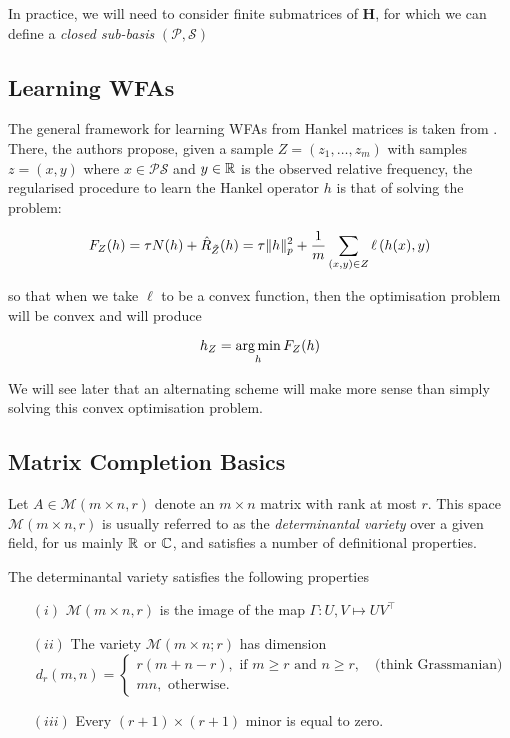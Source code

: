 \documentclass[12pt]{article}
\begin{document}
In practice, we will need to consider finite submatrices of $\mathbf{H}$, for which we can define a \emph{closed sub-basis} $\left(\mathcal{P},\mathcal{S}\right)$

\subsection{Learning WFAs}

The general framework for learning WFAs from Hankel matrices is taken from \cite{ballewfalearning}. There, the authors propose, given a sample $Z = \left(z_1,\dots,z_m\right)$ with samples $z=(x,y)$ where $x\in\mathcal{PS}$ and $y\in\mathbb{R}$ is the observed relative frequency, the regularised procedure to learn the Hankel operator $h$ is that of solving the problem:

\begin{equation*}
    F_Z(h) = \tau N(h) + \Hat{R}_{\Tilde{Z}}(h) = \tau\lVert h\rVert_{p}^2 + \frac{1}{m}\sum_{(x,y)\in Z}{\ell\left(h(x),y\right)}
\end{equation*}

\noindent so that when we take $\ell$ to be a convex function, then the optimisation problem will be convex and will produce

\begin{equation*}
    h_Z = \operatorname*{arg\,min}_{h}{F_Z(h)}    
\end{equation*}

We will see later that an alternating scheme will make more sense than simply solving this convex optimisation problem.

\subsection{Matrix Completion Basics}

Let $A\in\mathcal{M}\left(m\times n, r\right)$ denote an $m\times n$ matrix with rank at most $r$. This space $\mathcal{M}\left(m\times n, r\right)$ is usually referred to as the \emph{determinantal variety} over a given field, for us mainly $\mathbb{R}$ or $\mathbb{C}$, and satisfies a number of definitional properties.

\begin{prop} The determinantal variety satisfies the following properties
    \begin{enumerate}
        \item[$(i)$] $\mathcal{M}\left(m\times n, r\right)$ is the image of the map $\Gamma:U,V\mapsto UV^{\top}$
        \item[$(ii)$] The variety $\mathcal{M}(m\times n;r)$ has dimension
        \begin{equation*}
            d_r(m,n) = \begin{cases}
                r(m+n-r) , \text{ if } m\ge r \text{ and } n\ge r, \quad \text{(think Grassmanian)}\\
                mn, \text{ otherwise}.
            \end{cases}
        \end{equation*}
        \item[$(iii)$] Every $(r+1)\times(r+1)$ minor is equal to zero.
    \end{enumerate}
\end{prop}
\end{document}

